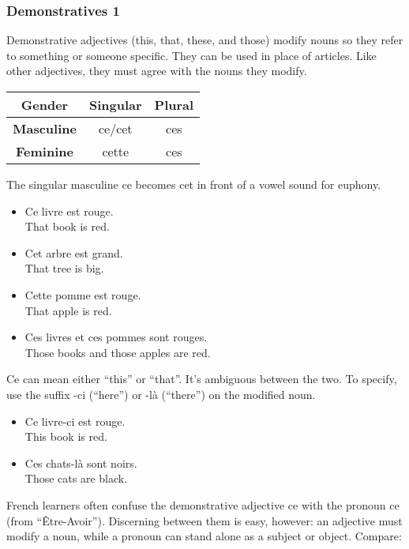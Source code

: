 \pagebreak
\subsubsection{Demonstratives 1}

Demonstrative adjectives (this, that, these, and those) modify nouns so they refer to something or someone specific. They can be used in place of articles. Like other adjectives, they must agree with the nouns they modify.

\begin{center}\begin{tabular}{|c|c|c|}
\hline
\textbf{Gender}    & \textbf{Singular} & \textbf{Plural} \\ \hline
\textbf{Masculine} & ce/cet            & ces             \\ \hline
\textbf{Feminine}  & cette             & ces             \\ \hline
\end{tabular}\end{center}

The singular masculine ce becomes cet in front of a vowel sound for euphony.

\begin{itemize}
  \item  Ce livre est rouge. \\ That book is red.
  \item  Cet arbre est grand. \\ That tree is big.
  \item  Cette pomme est rouge. \\ That apple is red.
  \item  Ces livres et ces pommes sont rouges. \\ Those books and those apples are red.
\end{itemize}

Ce can mean either ``this'' or ``that''. It's ambiguous between the two. To specify, use the suffix -ci (``here'') or -l{\`a} (``there'') on the modified noun.

\begin{itemize}
  \item  Ce livre-ci est rouge. \\ This book is red.
  \item  Ces chats-l{\`a} sont noirs. \\ Those cats are black. 
\end{itemize}

French learners often confuse the demonstrative adjective ce with the pronoun ce (from ``{\^E}tre-Avoir''). Discerning between them is easy, however: an adjective must modify a noun, while a pronoun can stand alone as a subject or object. Compare:

